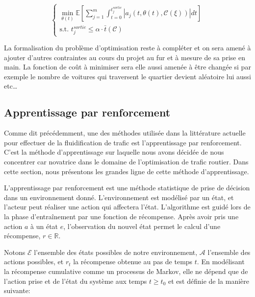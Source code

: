 \documentclass[11pt]{article}
\begin{document}
\begin{latex}
\begin{equation}
\begin{cases}
\displaystyle{\min_{\theta(t)}{\mathbb{E}\left [\sum_{j=1}^{m} \int_{t = 0}^{t^{sortie}_{j}}{ | a_{j}(t,\theta(t),\mathcal{C}(\xi)) | dt} \right ]}}\\
\text{s.t.~} t^{sortie}_{j} \leq \alpha \cdot \bar{t}(\mathcal{C})
\end{cases}
\end{equation}
\end{latex}

La formalisation du problème d'optimisation reste à compléter et on sera amené à ajouter d'autres contraintes au cours du projet au fur et à mesure de sa prise en main. La fonction de coût à minimiser sera elle aussi amenée à être changée si par exemple le nombre de voitures qui traversent le quartier devient aléatoire lui aussi etc\ldots{}


\subsection{Apprentissage par renforcement}
\label{sec:org18bb796}

Comme dit précédemment, une des méthodes utilisée dans la littérature actuelle pour effectuer de la fluidification de trafic est l'apprentissage par renforcement. C'est la méthode d'apprentissage sur laquelle nous avons décidée de nous concentrer car novatrice dans le domaine de l'optimisation de trafic routier. Dans cette section, nous présentons les grandes ligne de cette méthode d'apprentissage. 

L'apprentissage par renforcement est une méthode statistique de prise de décision dans un environnement donné. L'environnement est modélisé par un état, et l'acteur peut réaliser une action qui affectera l'état. L'algorithme est guidé lors de la phase d'entraînement par une fonction de récompense. Après avoir pris une action \(a\) à un état \(e\), l'observation du nouvel état permet le calcul d'une récompense, \(r \in \mathbb{R}\).

Notons \(\mathcal{E}\) l'ensemble des états possibles de notre environnement, \(\mathcal{A}\) l'ensemble des actions possibles, et \(r_t\) la récompense obtenue au pas de temps \(t\). En modélisant la récompense cumulative comme un processus de Markov, elle ne dépend que de l'action prise et de l'état du système aux temps \(t \geq t_0\) et est définie de la manière suivante:
\end{document}
